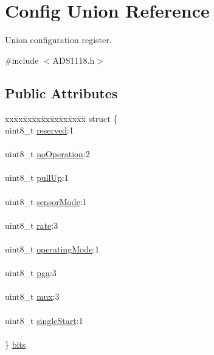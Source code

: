 \hypertarget{union_config}{}\section{Config Union Reference}
\label{union_config}


Union configuration register.  




{\ttfamily \#include $<$A\+D\+S1118.\+h$>$}

\subsection*{Public Attributes}
\begin{DoxyCompactItemize}
\item 
\mbox{\label{union_config_a6a595b692a95c9ee30ba05ddd39983c2}} 
\begin{tabbing}
xx\=xx\=xx\=xx\=xx\=xx\=xx\=xx\=xx\=\kill
struct \{\\
\>uint8\_t \mbox{\hyperlink{union_config_a86063c5813b60e24dc4b53620337fb81}{reserved}}:1\\
\>\\
\>uint8\_t \mbox{\hyperlink{union_config_aca5cedb4ac2d7fa28c9467bcc5dfdd30}{noOperation}}:2\\
\>\\
\>uint8\_t \mbox{\hyperlink{union_config_a384bc94c34f34120311b0fddb47fd310}{pullUp}}:1\\
\>\\
\>uint8\_t \mbox{\hyperlink{union_config_a4ded6b547eab12b96dd4aae64ef1e54d}{sensorMode}}:1\\
\>\\
\>uint8\_t \mbox{\hyperlink{union_config_a36aee2d940c4f67a376a93915d97a82a}{rate}}:3\\
\>\\
\>uint8\_t \mbox{\hyperlink{union_config_ab095a91d71a53f3eed6961f99c1fcc8b}{operatingMode}}:1\\
\>\\
\>uint8\_t \mbox{\hyperlink{union_config_a32de00c66e62581dd969c336ac1daae0}{pga}}:3\\
\>\\
\>uint8\_t \mbox{\hyperlink{union_config_a827213c227200ea6d1495fdbd4832cbb}{mux}}:3\\
\>\\
\>uint8\_t \mbox{\hyperlink{union_config_a75dfa0206a4d86658d165163040905d7}{singleStart}}:1\\
\>\\
\} \mbox{\hyperlink{union_config_a6a595b692a95c9ee30ba05ddd39983c2}{bits}}\\


\end{tabbing}
\end{DoxyCompactItemize}
